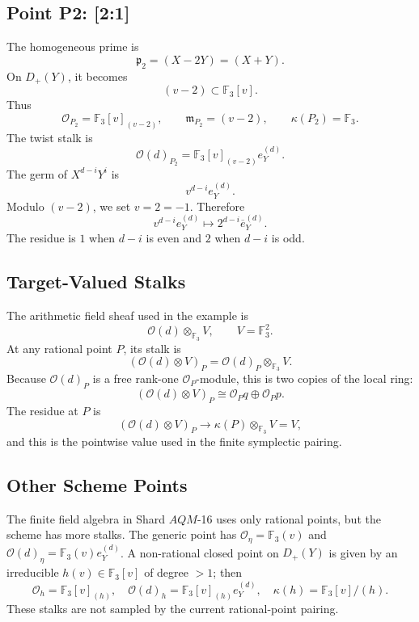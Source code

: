 \subsection{Point P2: [2:1]}

The homogeneous prime is
\[
  \mathfrak p_2=(X-2Y)=(X+Y).
\]
On \(D_+(Y)\), it becomes
\[
  (v-2)\subset\mathbb F_3[v].
\]
Thus
\[
  \mathcal O_{P_2}=\mathbb F_3[v]_{(v-2)},\qquad
  \mathfrak m_{P_2}=(v-2),\qquad
  \kappa(P_2)=\mathbb F_3.
\]
The twist stalk is
\[
  \mathcal O(d)_{P_2}=\mathbb F_3[v]_{(v-2)}e_Y^{(d)}.
\]
The germ of \(X^{d-i}Y^i\) is
\[
  v^{d-i}e_Y^{(d)}.
\]
Modulo \((v-2)\), we set \(v=2=-1\).  Therefore
\[
  v^{d-i}e_Y^{(d)}
  \longmapsto
  2^{d-i}\overline e_Y^{(d)}.
\]
The residue is \(1\) when \(d-i\) is even and \(2\) when \(d-i\) is odd.

\subsection{Target-Valued Stalks}

The arithmetic field sheaf used in the example is
\[
  \mathcal O(d)\otimes_{\mathbb F_3}V,\qquad V=\mathbb F_3^2.
\]
At any rational point \(P\), its stalk is
\[
  (\mathcal O(d)\otimes V)_P
  =
  \mathcal O(d)_P\otimes_{\mathbb F_3}V.
\]
Because \(\mathcal O(d)_P\) is a free rank-one \(\mathcal O_P\)-module, this
is two copies of the local ring:
\[
  (\mathcal O(d)\otimes V)_P
  \cong
  \mathcal O_P q\oplus \mathcal O_P p.
\]
The residue at \(P\) is
\[
  (\mathcal O(d)\otimes V)_P
  \longrightarrow
  \kappa(P)\otimes_{\mathbb F_3}V
  =
  V,
\]
and this is the pointwise value used in the finite symplectic pairing.

\subsection{Other Scheme Points}

The finite field algebra in Shard \(AQM\)-16 uses only rational points, but
the scheme has more stalks.  The generic point has
\(\mathcal O_\eta=\mathbb F_3(v)\) and
\(\mathcal O(d)_\eta=\mathbb F_3(v)e_Y^{(d)}\).  A non-rational closed point
on \(D_+(Y)\) is given by an irreducible \(h(v)\in\mathbb F_3[v]\) of degree
\(>1\); then
\[
  \mathcal O_h=\mathbb F_3[v]_{(h)},\quad
  \mathcal O(d)_h=\mathbb F_3[v]_{(h)}e_Y^{(d)},\quad
  \kappa(h)=\mathbb F_3[v]/(h).
\]
These stalks are not sampled by the current rational-point pairing.
